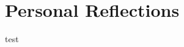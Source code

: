 \documentclass[]{article}
\begin{document}
\pagebreak
    \section{Personal Reflections}
    test
\end{document}
